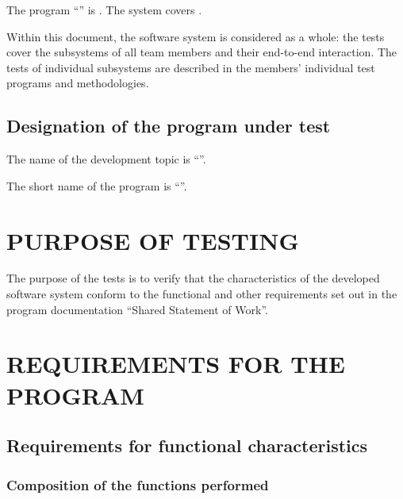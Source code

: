 \documentclass[12pt,a4paper]{extarticle}
\begin{document}
The program \enquote{\projectname} is . The system covers .

Within this document, the software system is considered as a whole: the tests cover the subsystems of all team members and their end-to-end interaction. The tests of individual subsystems are described in the members' individual test programs and methodologies.

\subsection{Designation of the program under test}

The name of the development topic is \enquote{\projectname}.

The short name of the program is \enquote{\hseProjectNameShort}.

\clearpage

\section{PURPOSE OF TESTING}

The purpose of the tests is to verify that the characteristics of the developed software system conform to the functional and other requirements set out in the program documentation \enquote{Shared Statement of Work}.

\clearpage

\section{REQUIREMENTS FOR THE PROGRAM}

\subsection{Requirements for functional characteristics}

\subsubsection{Composition of the functions performed}
\end{document}
